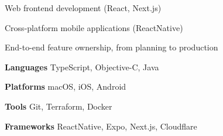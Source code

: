 \documentclass[11pt,a4paper,sans]{awesomecv}
\begin{document}
\makecvheader[C]

\let\bodyfont\cambria

\newcommand{\cvlistitem}[1]{\item {\fontsize{12pt}{1em}\bodyfont\upshape\color{darktext} #1}}
\newenvironment{cvlist}{
  \begin{description}[
      itemindent=0em,
      labelwidth=0em,
      labelsep=0em,
      leftmargin=0em,
      parsep=1ex
    ]
}{
  \end{description}
}

\newcommand{\cvdescriptionitem}[2]{\item[{\fontsize{12pt}{1em}\bodyfont\bfseries\color{darktext} #1}] {\fontsize{12pt}{1em}\cambria\upshape\color{darktext} #2}}
\newenvironment{cvdescription}{
  \begin{description}[
      parsep=1ex,
    ]
}{
  \end{description}
}

\begin{cvlist}
  \cvlistitem{Web frontend development (React, Next.js)}
  \cvlistitem{Cross-platform mobile applications (ReactNative)}
  \cvlistitem{End-to-end feature ownership, from planning to production}
\end{cvlist}

\begin{cvdescription}
\cvdescriptionitem{Languages}{TypeScript, Objective-C, Java}
\cvdescriptionitem{Platforms}{macOS, iOS, Android}
\cvdescriptionitem{Tools}{Git, Terraform, Docker}
\cvdescriptionitem{Frameworks}{ReactNative, Expo, Next.js, Cloudflare}
\end{cvdescription}

\renewcommand*{\entrypositionstyle}[1]{{\fontsize{12pt}{1em}\bodyfont\bfseries\color{darktext} #1}}
\renewcommand*{\entrydatestyle}[1]{{\fontsize{11pt}{1em}\bodyfont\slshape\color{graytext} #1}}
\newcommand*{\entryemployerstyle}[1]{{\fontsize{11pt}{1em}\bodyfont\bfseries\color{graytext} #1}}
\newcommand*{\entryurlstyle}[1]{{\fontsize{11pt}{1em}\bodyfont\upshape\color{graytext} #1}}
\newcommand*{\entrydescriptionstyle}[1]{{\fontsize{12pt}{1em}\bodyfont\upshape\color{text} #1}}

\renewcommand*{\cventry}[5]{
  \setlength\tabcolsep{0pt}
  \setlength{\extrarowheight}{1ex}
  \begin{tabular*}{\textwidth}{@{\extracolsep{\fill}} l r}
    \noalign{\vspace{-2ex}}
    \entrypositionstyle{#1} & \entrydatestyle{#2} \\
    \entryemployerstyle{#3} & \entryurlstyle{\url{#4}} \\
    \multicolumn{2}{L{\textwidth}}{
      \entrydescriptionstyle{#5}
    }
  \end{tabular*}
}
\end{document}
